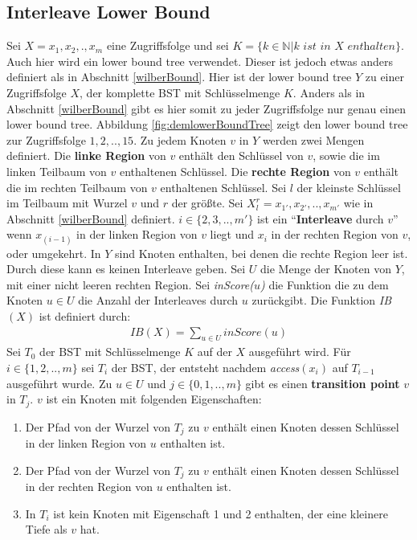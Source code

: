\documentclass[a4paper,12pt]{article}
\begin{document}
\subsection{Interleave Lower Bound} \label{interBound}
Sei $X = x_1,x_2,.,x_m$ eine Zugriffsfolge und sei $K = \{k \in \mathbb{N} \vert k \textit{ ist in $X$ enthalten}\}$. Auch hier wird ein lower bound tree verwendet. Dieser ist jedoch etwas anders definiert als in Abschnitt \ref{wilberBound}. Hier ist der lower bound tree $Y$ zu einer Zugriffsfolge $X$, der komplette BST mit Schlüsselmenge $K$. Anders als in Abschnitt \ref{wilberBound}  gibt es hier somit zu jeder Zugriffsfolge nur genau einen lower bound tree. Abbildung \ref{fig:demlowerBoundTree} zeigt den lower bound tree zur Zugriffsfolge $1, 2,.., 15$. Zu jedem Knoten $v$ in $Y$ werden zwei Mengen definiert. Die \textbf{linke Region} von $v$ enthält den Schlüssel von $v$, sowie die im linken Teilbaum von $v$ enthaltenen Schlüssel.  Die \textbf{rechte Region} von $v$ enthält die im rechten Teilbaum von $v$ enthaltenen Schlüssel. Sei $l$ der kleinste Schlüssel im Teilbaum mit Wurzel $v$ und $r$ der größte. Sei  $X^r_l = {x_{1'},x_{2'},..,x_{m'}}$ wie in Abschnitt \ref{wilberBound} definiert. $i \in \{2,3,..,m'\}$ ist ein \enquote{\textbf{Interleave} durch $v$} wenn $x_{\left(i -1\right)}$ in der linken Region von $v$ liegt und $x_i$ in der rechten Region von $v$, oder umgekehrt. In $Y$ sind Knoten enthalten, bei denen die rechte Region leer ist. Durch diese kann es keinen Interleave geben. Sei $U$ die Menge der Knoten von $Y$, mit einer nicht leeren rechten Region. Sei \textit{inScore($u$)} die Funktion die zu dem Knoten $u \in U$ die Anzahl der Interleaves durch $u$ zurückgibt.  Die Funktion \textit{IB$\left(X\right)$} ist definiert durch:
\begin{align*}
\mathit{IB}\left(X\right) = \sum_{u \in U} \mathit{inScore}\left(u\right)
\end{align*}
Sei $T_0$ der BST mit Schlüsselmenge $K$ auf der $X$ ausgeführt wird. Für $i \in \{1,2,..,m\}$ sei $T_i$ der BST, der entsteht nachdem \textit{access}$\left(x_i\right)$ auf $T_{i-1}$ ausgeführt wurde. Zu $u \in U$ und  $j \in \{0,1,..,m\}$ gibt es einen \textbf{transition point} $v$ in $T_j$. $v$ ist ein Knoten mit folgenden Eigenschaften:\\
\begin{enumerate}
	\item Der Pfad von der Wurzel von $T_j$ zu $v$ enthält einen Knoten dessen Schlüssel in der linken Region von $u$ enthalten ist.
	\item Der Pfad von der Wurzel von $T_j$ zu $v$ enthält einen Knoten dessen Schlüssel in der rechten Region von $u$ enthalten ist.
	\item In $T_i$ ist kein Knoten mit Eigenschaft 1 und 2 enthalten, der eine kleinere Tiefe als $v$ hat. 
\end{enumerate}
\end{document}
